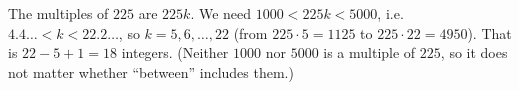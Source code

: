 The multiples of $225$ are $225k$. We need $1000<225k<5000$, i.e. $4.4\ldots<k<22.2\ldots$, so $k=5,6,\dots,22$ (from $225\cdot5=1125$ to $225\cdot22=4950$). That is $22-5+1=\boxed{18}$ integers. (Neither $1000$ nor $5000$ is a multiple of $225$, so it does not matter whether ``between'' includes them.)
